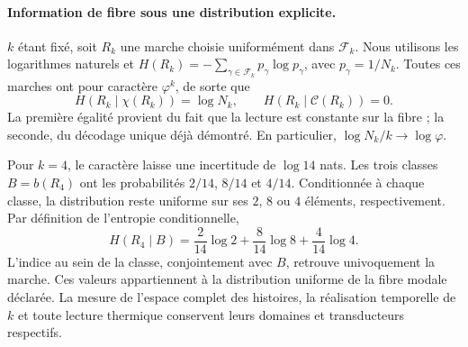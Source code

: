 \paragraph{Information de fibre sous une distribution explicite.}
\(k\) étant fixé, soit \(R_k\) une marche choisie uniformément dans \(\mathcal F_k\). Nous utilisons les logarithmes naturels et \(H(R_k)=-\sum_{\gamma\in\mathcal F_k}p_\gamma\log p_\gamma\), avec \(p_\gamma=1/N_k\). Toutes ces marches ont pour caractère \(\varphi^k\), de sorte que
\[
 H(R_k\mid\chi(R_k))=\log N_k,\qquad
 H(R_k\mid\mathcal C(R_k))=0.
\]
La première égalité provient du fait que la lecture est constante sur la fibre ; la seconde, du décodage unique déjà démontré. En particulier, \(\log N_k/k\to\log\varphi\).

Pour \(k=4\), le caractère laisse une incertitude de \(\log14\)
nats. Les trois classes \(B=b(R_4)\) ont les probabilités
\(2/14\), \(8/14\) et \(4/14\). Conditionnée à chaque classe, la
distribution reste uniforme sur ses \(2\), \(8\) ou \(4\)
éléments, respectivement. Par définition de l'entropie
conditionnelle,
\[
 H(R_4\mid B)
 =\frac2{14}\log2+\frac8{14}\log8+\frac4{14}\log4.
\]
L'indice au sein de la classe, conjointement avec \(B\), retrouve univoquement
la marche. Ces valeurs appartiennent à la distribution uniforme
de la fibre modale déclarée. La mesure de l'espace complet des
histoires, la réalisation temporelle de \(k\) et toute lecture
thermique conservent leurs domaines et transducteurs respectifs.
